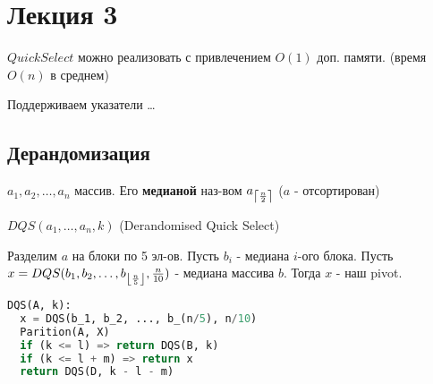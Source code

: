 \section{Лекция 3}

\begin{note}
$QuickSelect$ можно реализовать с привлечением $O(1)$ доп. памяти. (время $O(n)$ в среднем)
\end{note}
\begin{solution}
Поддерживаем указатели \ldots
\end{solution}

\subsection{Дерандомизация}

\begin{definition}
$a_1, a_2, \ldots , a_n$ массив. Его \textbf{медианой} наз-вом $a_{\left\lceil \frac{n}{2} \right\rceil }$ ($a$ - отсортирован)
\end{definition}

\begin{algo}
$DQS(a_1, \ldots , a_n, k)$ (Derandomised Quick Select)

Разделим $a$ на блоки по 5 эл-ов. Пусть $b_i$ - медиана $i$-ого блока. Пусть $x = DQS(b_1, b_2, \ldots , b_{\left\lfloor \frac{n}{5} \right\rfloor}, \frac{n}{10})$ - медиана массива $b$. Тогда $x$ - наш pivot.
\end{algo}
\lstset{style=mystyle}
\begin{lstlisting}[language=Python, caption=Updated DQS]
DQS(A, k):
  x = DQS(b_1, b_2, ..., b_(n/5), n/10)
  Parition(A, X)
  if (k <= l) => return DQS(B, k)
  if (k <= l + m) => return x
  return DQS(D, k - l - m)
\end{lstlisting}

